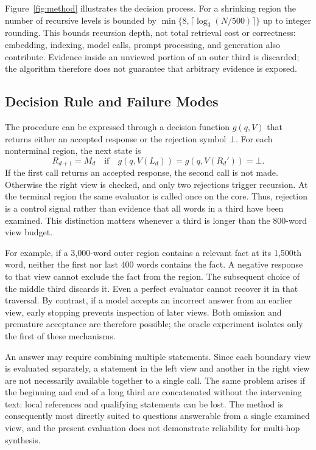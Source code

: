 \documentclass[conference]{IEEEtran}
\begin{document}
Figure~\ref{fig:method} illustrates the decision process. For a shrinking region the number of recursive levels is bounded by $\min\{8,\lceil\log_3(N/500)\rceil\}$ up to integer rounding. This bounds recursion depth, not total retrieval cost or correctness: embedding, indexing, model calls, prompt processing, and generation also contribute. Evidence inside an unviewed portion of an outer third is discarded; the algorithm therefore does not guarantee that arbitrary evidence is exposed.

\subsection{Decision Rule and Failure Modes}
The procedure can be expressed through a decision function $g(q,V)$ that returns either an accepted response or the rejection symbol $\bot$. For each nonterminal region, the next state is
\begin{equation}
R_{d+1}=M_d\quad\text{if}\quad
 g(q,V(L_d))=g(q,V(R_d'))=\bot .
\end{equation}
If the first call returns an accepted response, the second call is not made. Otherwise the right view is checked, and only two rejections trigger recursion. At the terminal region the same evaluator is called once on the core. Thus, rejection is a control signal rather than evidence that all words in a third have been examined. This distinction matters whenever a third is longer than the 800-word view budget.

For example, if a 3,000-word outer region contains a relevant fact at its 1,500th word, neither the first nor last 400 words contains the fact. A negative response to that view cannot exclude the fact from the region. The subsequent choice of the middle third discards it. Even a perfect evaluator cannot recover it in that traversal. By contrast, if a model accepts an incorrect answer from an earlier view, early stopping prevents inspection of later views. Both omission and premature acceptance are therefore possible; the oracle experiment isolates only the first of these mechanisms.

An answer may require combining multiple statements. Since each boundary view is evaluated separately, a statement in the left view and another in the right view are not necessarily available together to a single call. The same problem arises if the beginning and end of a long third are concatenated without the intervening text: local references and qualifying statements can be lost. The method is consequently most directly suited to questions answerable from a single examined view, and the present evaluation does not demonstrate reliability for multi-hop synthesis.
\end{document}
